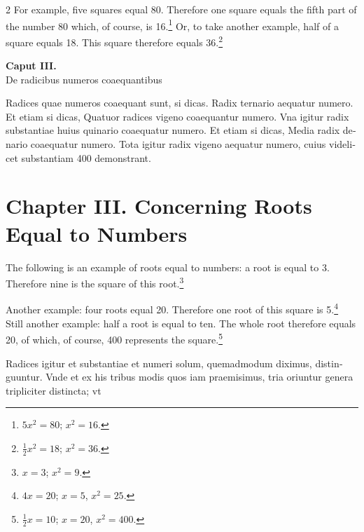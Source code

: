 \documentclass[11pt,a4paper,twoside]{book}
\newcommand{\latincolumn}[1]{\textlatin{\small #1}}
\begin{document}
\begin{paracol}{2}
For example, five squares equal 80. Therefore one square equals the fifth part of the number 80 which, of course, is 16.\footnote{$5x^2 = 80$; $x^2 = 16$.} Or, to take another example, half of a square equals 18. This square therefore equals 36.\footnote{$\frac{1}{2}x^2 = 18$; $x^2 = 36$.}

\switchcolumn*

\begin{center}
{\normalsize\bfseries\color{sectioncolor} Caput III.}\\[0.2cm]
\latincolumn{De radicibus numeros coaequantibus}
\end{center}

\medskip

\latincolumn{Radices quae numeros coaequant sunt, si dicas. Radix ternario aequatur numero. Et etiam si dicas, Quatuor radices vigeno coaequantur numero. Vna igitur radix substantiae huius quinario coaequatur numero. Et etiam si dicas, Media radix denario coaequatur numero. Tota igitur radix vigeno aequatur numero, cuius videlicet substantiam 400 demonstrant.}

\switchcolumn

\section*{Chapter III. Concerning Roots Equal to Numbers}

The following is an example of roots equal to numbers: a root is equal to 3. Therefore nine is the square of this root.\footnote{$x = 3$; $x^2 = 9$.}

Another example: four roots equal 20. Therefore one root of this square is 5.\footnote{$4x = 20$; $x = 5$, $x^2 = 25$.} Still another example: half a root is equal to ten. The whole root therefore equals 20, of which, of course, 400 represents the square.\footnote{$\frac{1}{2}x = 10$; $x = 20$, $x^2 = 400$.}

\switchcolumn*

\latincolumn{Radices igitur et substantiae et numeri solum, quemadmodum diximus, distinguuntur. Vnde et ex his tribus modis quos iam praemisimus, tria oriuntur genera tripliciter distincta; vt}


\end{paracol}
\end{document}
